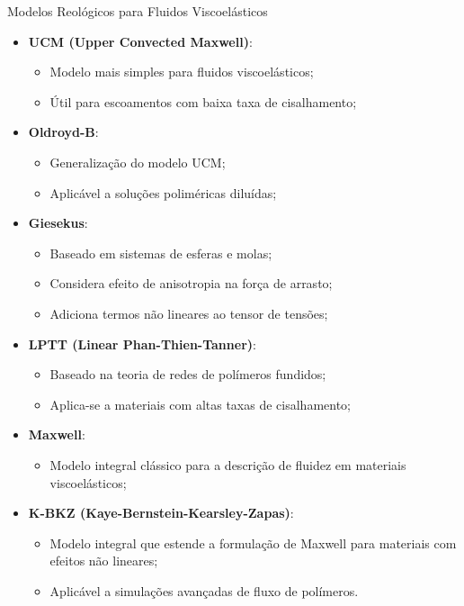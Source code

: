 \begin{frame}{Modelos Reológicos para Fluidos Viscoelásticos}
\begin{itemize}
    \item \textbf{UCM (Upper Convected Maxwell)}: \cite{beris1987spectral}
    \begin{itemize}
        \item Modelo mais simples para fluidos viscoelásticos;
        \item Útil para escoamentos com baixa taxa de cisalhamento;
    \end{itemize}
    \item \textbf{Oldroyd-B}: \cite{brasseur1998time}
    \begin{itemize}
        \item Generalização do modelo UCM;
        \item Aplicável a soluções poliméricas diluídas;
    \end{itemize}
    \item \textbf{Giesekus}: \cite{giesekus1962}
    \begin{itemize}
        \item Baseado em sistemas de esferas e molas;
        \item Considera efeito de anisotropia na força de arrasto;
        \item Adiciona termos não lineares ao tensor de tensões;
    \end{itemize}
    \item \textbf{LPTT (Linear Phan-Thien-Tanner)}: \cite{phan-thien77}
    \begin{itemize}
        \item Baseado na teoria de redes de polímeros fundidos;
        \item Aplica-se a materiais com altas taxas de cisalhamento;
    \end{itemize}
    \item \textbf{Maxwell}: \cite{Kaye62}
    \begin{itemize}
        \item Modelo integral clássico para a descrição de fluidez em materiais viscoelásticos;
    \end{itemize}
    \item \textbf{K-BKZ (Kaye-Bernstein-Kearsley-Zapas)}: \cite{luo88}
    \begin{itemize}
        \item Modelo integral que estende a formulação de Maxwell para materiais com efeitos não lineares;
        \item Aplicável a simulações avançadas de fluxo de polímeros.
    \end{itemize}
\end{itemize}
\end{frame}

